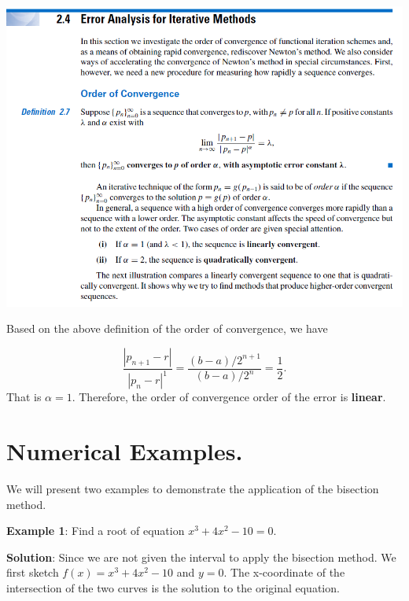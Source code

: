 \documentclass[
]{book}
\begin{document}
\begin{center}\includegraphics[width=1\linewidth]{img03/w03-ErrorAnalysis-ConvergenceOrder} \end{center}

\hfill\break

Based on the above definition of the order of convergence, we have

\[
\frac{|p_{n+1} - r|}{|p_n - r|^1} = \frac{(b-a)/2^{n+1}}{(b - a)/2^n} = \frac{1}{2}. 
\]
That is \(\alpha = 1\). Therefore, the order of convergence order of the error is \textbf{linear}.

\hfill\break

\hypertarget{numerical-examples.}{%
\section{Numerical Examples.}\label{numerical-examples.}}

We will present two examples to demonstrate the application of the bisection method.

\textbf{Example 1}: Find a root of equation \(x^3+4x^2-10 = 0\).

\textbf{Solution}: Since we are not given the interval to apply the bisection method. We first sketch \(f(x) = x^3+4x^2-10\) and \(y = 0\). The x-coordinate of the intersection of the two curves is the solution to the original equation.
\end{document}
